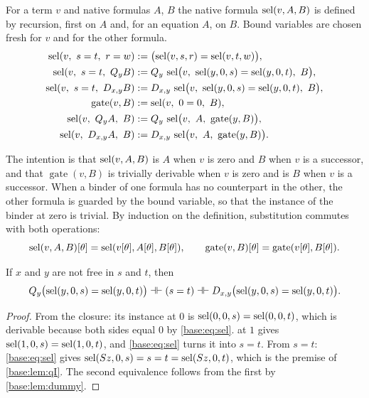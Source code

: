 \begin{definition}
\label{base:def:gate}
For a term $v$ and native formulas $A$, $B$ the native formula
$\operatorname{sel}(v,A,B)$ is defined by recursion, first on $A$ and, for an equation
$A$, on $B$.  Bound variables are chosen fresh for $v$ and for the other
formula.
\begin{align*}
 \sel(v,\ s=t,\ r=w) &\defeq \bigl(\sel(v,s,r)=\sel(v,t,w)\bigr),\\
 \sel(v,\ s=t,\ \Q{y}B) &\defeq
   \Q{y}\,\sel\bigl(v,\ \sel(y,0,s)=\sel(y,0,t),\ B\bigr),\\
 \sel(v,\ s=t,\ \D{x}{y}B) &\defeq
   \D{x}{y}\,\sel\bigl(v,\ \sel(y,0,s)=\sel(y,0,t),\ B\bigr),\\
 \operatorname{gate}(v,B) &\defeq \sel(v,\ 0=0,\ B),\\
 \sel(v,\ \Q{y}A,\ B) &\defeq \Q{y}\,\sel\bigl(v,\ A,\ \operatorname{gate}(y,B)\bigr),\\
 \sel(v,\ \D{x}{y}A,\ B) &\defeq
   \D{x}{y}\,\sel\bigl(v,\ A,\ \operatorname{gate}(y,B)\bigr).
\end{align*}
\end{definition}

The intention is that $\operatorname{sel}(v,A,B)$ is $A$ when $v$ is zero and $B$ when $v$
is a successor, and that $\operatorname{gate}(v,B)$ is trivially derivable
when $v$ is zero and is $B$ when $v$ is a successor.  When a binder of one
formula has no counterpart in the other, the other formula is guarded by the
bound variable, so that the instance of the binder at zero is trivial.  By
induction on the definition, substitution commutes with both operations:
\begin{equation}
 \operatorname{sel}(v,A,B)[\theta]=\operatorname{sel}(v[\theta],A[\theta],B[\theta]),\qquad
 \operatorname{gate}(v,B)[\theta]=\operatorname{gate}(v[\theta],B[\theta]).
 \label{base:eq:sel-subst}
\end{equation}

\begin{lemma}
\label{base:lem:qsel}
If $x$ and $y$ are not free in $s$ and $t$, then
\[
 Q_{y}\bigl(\operatorname{sel}(y,0,s)=\operatorname{sel}(y,0,t)\bigr)\dashv\vdash (s=t)
 \dashv\vdash D_{x,y}\bigl(\operatorname{sel}(y,0,s)=\operatorname{sel}(y,0,t)\bigr).
\]
\end{lemma}

\begin{proof}
From the closure: its instance at $0$ is $\operatorname{sel}(0,0,s)=\operatorname{sel}(0,0,t)$, which is
derivable because both sides equal $0$ by \eqref{base:eq:sel}.
 at $1$ gives $\operatorname{sel}(1,0,s)=\operatorname{sel}(1,0,t)$, and
\eqref{base:eq:sel} turns it into $s=t$.  From $s=t$:
\eqref{base:eq:sel} gives
$\operatorname{sel}(S z,0,s)=s=t=\operatorname{sel}(S z,0,t)$, which is the premise of
\cref{base:lem:qI}.  The second equivalence follows from the first by
\cref{base:lem:dummy}.
\end{proof}

